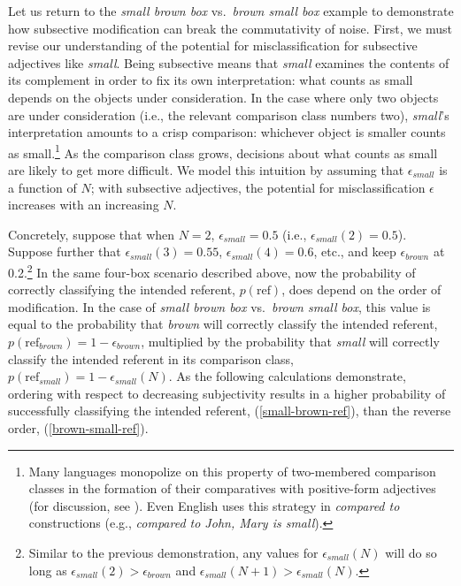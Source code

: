 \documentclass[preprint,authoryear]{elsarticle}\frenchspacing
\newcommand{\gcs}[1]{\textcolor{blue}{[gcs: #1]}}
\begin{document}
Let us return to the \emph{small brown box} vs.~\emph{brown small box} example to demonstrate how subsective modification can break the commutativity of noise. First, we must revise our understanding of the potential for misclassification for subsective adjectives like \emph{small}. Being subsective means that 
\emph{small} examines the contents of its complement in order to fix its own interpretation: what counts as {small} depends on the objects under consideration. In the case where only two objects are under consideration (i.e., the relevant comparison class numbers two), \emph{small}'s interpretation amounts to a crisp comparison: whichever object is smaller counts as small.\footnote{Many languages monopolize on this property of two-membered comparison classes in the formation of their comparatives with positive-form adjectives (for discussion, see \citealp{becketal2009}). Even English uses this strategy in \emph{compared to} constructions (e.g., \emph{compared to John, Mary is small}).} As the comparison class grows, decisions about what counts as small are likely to get more difficult. We model this intuition by assuming that $\epsilon_{small}$ is a function of $N$; with subsective adjectives, the potential for misclassification $\epsilon$ increases with an increasing $N$. 

Concretely, suppose that when $N = 2$, $\epsilon_{small} = 0.5$ (i.e.,   $\epsilon_{small}(2) = 0.5$). Suppose further that $\epsilon_{small}(3) = 0.55$, $\epsilon_{small}(4) = 0.6$, etc., and keep $\epsilon_{brown}$ at 0.2.\footnote{Similar to the previous demonstration, any values for $\epsilon_{small}(N)$ will do so long as $\epsilon_{small}(2) > \epsilon_{brown}$ and $\epsilon_{small}(N+1) > \epsilon_{small}(N)$.} In the same four-box scenario described above, now the probability of correctly classifying the intended referent, $p(\textrm{ref})$, does depend on the order of modification. In the case of \emph{small brown box} vs.~\emph{brown small box}, this value is equal to the probability that \emph{brown} will correctly classify the intended referent, $p(\textrm{ref}_{brown}) = 1 - \epsilon_{brown}$, multiplied by the probability that \emph{small} will correctly classify the intended referent in its comparison class, $p(\textrm{ref}_{small}) = 1 - \epsilon_{small}(N)$. As the following calculations demonstrate, ordering with respect to decreasing subjectivity results in a higher probability of successfully classifying the intended referent, (\ref{small-brown-ref}), than the reverse order, (\ref{brown-small-ref}).
\end{document}
